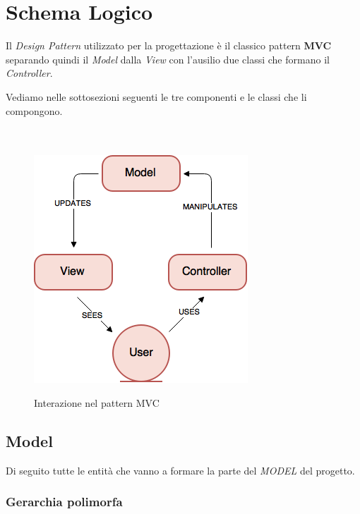 \documentclass[10pt,a4paper,openany]{article}
\begin{document}
\section{Schema Logico}	

Il \textit{Design Pattern} utilizzato per la progettazione è il classico pattern \textbf{MVC} separando quindi il \textit{Model} dalla \textit{View} con l'ausilio due classi che formano il \textit{Controller}.

Vediamo nelle sottosezioni seguenti le tre componenti e le classi che li compongono.\\\\\\


\begin{figure}[!h]
\centering
\includegraphics[angle=0,scale=.45]{MVC.png}\\
\caption{Interazione nel pattern MVC}
\label{fig:MVC}
\end{figure}


\newpage

	\subsection{Model}
	
	Di seguito tutte le entità che vanno a formare la parte del \emph{MODEL} del progetto.
	
		\subsubsection{Gerarchia polimorfa}
	
\end{document}
